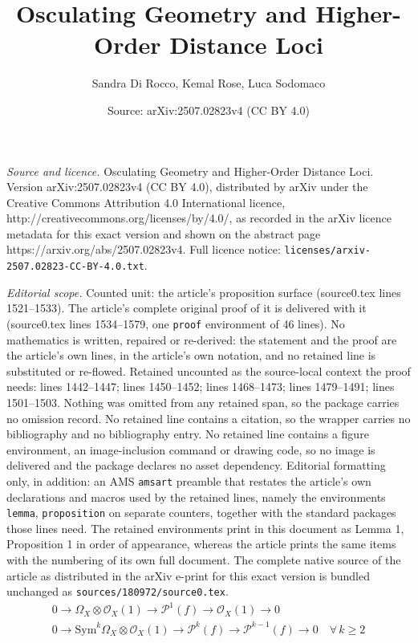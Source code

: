 \documentclass[10pt,a4paper]{amsart}
\title{Osculating Geometry and Higher-Order Distance Loci}
\author{Sandra Di Rocco, Kemal Rose, Luca Sodomaco}
\date{Source: arXiv:2507.02823v4 (CC BY 4.0)}
\newcommand{\OO}{\mathcal{O}}
\newcommand{\PP}{\mathcal{P}}
\begin{document}
\maketitle

\noindent\emph{Source and licence.} Osculating Geometry and Higher-Order Distance Loci. Version arXiv:2507.02823v4 (CC BY 4.0), distributed by arXiv under the Creative Commons Attribution 4.0 International licence, http://creativecommons.org/licenses/by/4.0/, as recorded in the arXiv licence metadata for this exact version and shown on the abstract page https://arxiv.org/abs/2507.02823v4. Full licence notice: \texttt{licenses/arxiv-2507.02823-CC-BY-4.0.txt}.\par\smallskip

\noindent\textit{Editorial scope.} Counted unit: the article's proposition surface (source0.tex lines 1521--1533). The article's complete original proof of it is delivered with it (source0.tex lines 1534--1579, one \texttt{proof} environment of 46 lines). No mathematics is written, repaired or re-derived: the statement and the proof are the article's own lines, in the article's own notation, and no retained line is substituted or re-flowed.  Retained uncounted as the source-local context the proof needs: lines 1442--1447; lines 1450--1452; lines 1468--1473; lines 1479--1491; lines 1501--1503.  Nothing was omitted from any retained span, so the package carries no omission record.  No retained line contains a citation, so the wrapper carries no bibliography and no bibliography entry.  No retained line contains a figure environment, an image-inclusion command or drawing code, so no image is delivered and the package declares no asset dependency.  Editorial formatting only, in addition: an AMS \texttt{amsart} preamble that restates the article's own declarations and macros used by the retained lines, namely the environments \texttt{lemma}, \texttt{proposition} on separate counters, together with the standard packages those lines need.  The retained environments print in this document as Lemma 1, Proposition 1 in order of appearance, whereas the article prints the same items with the numbering of its own full document.  The complete native source of the article as distributed in the arXiv e-print for this exact version is bundled unchanged as \texttt{sources/180972/source0.tex}.
\begin{equation}\label{eq: two short exact sequences}
\begin{gathered}
    0\to \Omega_X\otimes\OO_X(1) \longrightarrow \PP^1(f) \longrightarrow \OO_X(1) \to 0\\
    0\to \mathrm{Sym}^k\Omega_X\otimes\OO_X(1) \longrightarrow \PP^k(f) \longrightarrow \PP^{k-1}(f) \to 0\quad\forall\,k\ge 2
\end{gathered}
\end{equation}
\end{document}
